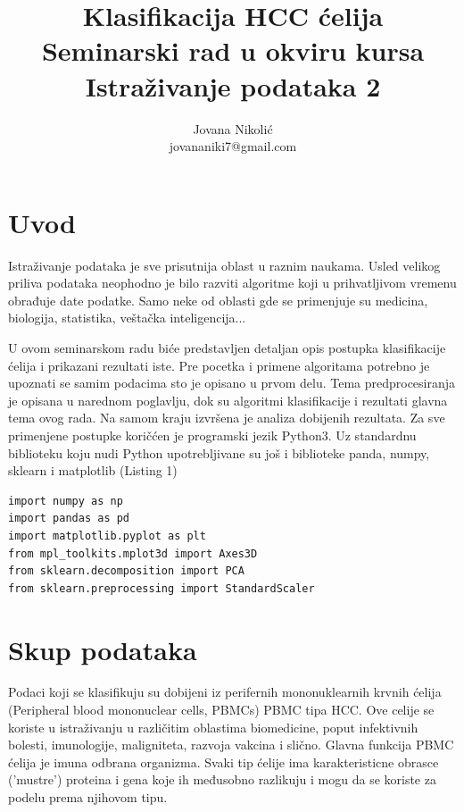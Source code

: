 \documentclass[14pt]{extarticle}
\begin{document}
\title{Klasifikacija HCC ćelija\\ \small{Seminarski rad u okviru kursa Istraživanje podataka 2}}

\author{Jovana Nikolić\\ \small{jovananiki7@gmail.com}}


\maketitle


\tableofcontents

\newpage

\section{Uvod}
\label{sec:uvod}
Istraživanje podataka je sve prisutnija oblast u raznim naukama. Usled velikog priliva podataka neophodno je bilo razviti algoritme koji u prihvatljivom vremenu obrađuje date podatke. Samo neke od oblasti gde se primenjuje su medicina, biologija, statistika, veštačka inteligencija...

U ovom seminarskom radu biće predstavljen detaljan opis postupka klasifikacije ćelija i prikazani rezultati iste. Pre pocetka i primene algoritama potrebno je upoznati se samim podacima sto je opisano u prvom delu. Tema predprocesiranja je opisana u narednom poglavlju, dok su algoritmi klasifikacije i rezultati glavna tema ovog rada. Na samom kraju izvršena je analiza dobijenih rezultata. Za sve primenjene postupke koričćen je programski jezik Python3. Uz standardnu biblioteku koju nudi Python upotrebljivane su još i biblioteke panda, numpy, sklearn i matplotlib (Listing 1)

\begin{lstlisting}[caption={Import biblioteka},frame=single, label=simple]
import numpy as np
import pandas as pd
import matplotlib.pyplot as plt
from mpl_toolkits.mplot3d import Axes3D
from sklearn.decomposition import PCA
from sklearn.preprocessing import StandardScaler
\end{lstlisting}


\section{Skup podataka} 
Podaci koji se klasifikuju su dobijeni iz perifernih mononuklearnih krvnih ćelija (Peripheral blood mononuclear cells, PBMCs) PBMC tipa HCC. Ove celije se koriste u istraživanju u različitim oblastima biomedicine, poput infektivnih bolesti, imunologije,
maligniteta, razvoja vakcina i slično. Glavna funkcija PBMC ćelija je imuna odbrana organizma. Svaki tip ćelije ima karakteristicne obrasce ('mustre') proteina i gena koje ih međusobno razlikuju i mogu da se koriste za podelu prema njihovom tipu.
\end{document}
